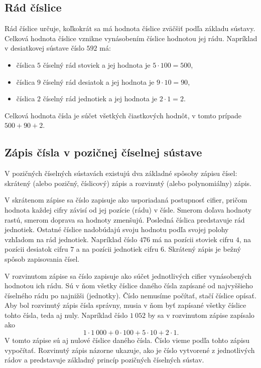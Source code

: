\documentclass{report}
\begin{document}
\subsection{Rád číslice}

Rád číslice určuje, koľkokrát sa má hodnota číslice zväčšiť podľa základu sústavy. Celková hodnota číslice vznikne vynásobením číslice hodnotou jej rádu. Napríklad v desiatkovej sústave číslo \(592\) má:
\begin{itemize}
  \item číslica \(5\) číselný rád stoviek a jej hodnota je \(5 \cdot 100 = 500\),
  \item číslica \(9\) číselný rád desiatok a jej hodnota je \(9 \cdot 10 = 90\),
  \item číslica \(2\) číselný rád jednotiek a jej hodnota je \(2 \cdot 1 = 2\).
\end{itemize}
Celková hodnota čísla je súčet všetkých čiastkových hodnôt, v tomto prípade \(500 + 90 + 2\).

\subsection{Zápis čísla v pozičnej číselnej sústave}

V pozičných číselných sústavách existujú dva základné spôsoby zápisu čísel: skrátený (alebo pozičný, číslicový) zápis a rozvinutý (alebo polynomiálny) zápis.

V skrátenom zápise sa číslo zapisuje ako usporiadaná postupnosť cifier, pričom hodnota každej cifry závisí od jej pozície (rádu) v čísle. Smerom doľava hodnoty rastú, smerom doprava sa hodnoty zmenšujú. Posledná číslica predstavuje rád jednotiek. Ostatné číslice nadobúdajú svoju hodnotu podľa svojej polohy vzhľadom na rád jednotiek. Napríklad číslo \(476\) má na pozícii stoviek cifru \(4\), na pozícii desiatok cifru \(7\) a na pozícii jednotiek cifru \(6\). Skrátený zápis je bežný spôsob zapisovania čísel.

V rozvinutom zápise sa číslo zapisuje ako súčet jednotlivých cifier vynásobených hodnotou ich rádu. Sú v ňom všetky číslice daného čísla zapísané od najvyššieho číselného rádu po najnižši (jednotky). Číslo nemusíme počítať, stačí číslice opísať. Aby bol rozvinutý zápis čísla správny, musia v ňom byť zapísané všetky číslice tohto čísla, teda aj nuly. Napríklad číslo \(1\ 052\) by sa v rozvinutom zápise zapísalo ako
\[
1 \cdot 1\ 000 + 0 \cdot 100 + 5 \cdot 10 + 2 \cdot 1.
\]
V tomto zápise sú aj nulové číslice daného čísla. Číslo vieme podľa tohto zápisu vypočítať. Rozvinutý zápis názorne ukazuje, ako je číslo vytvorené z jednotlivých rádov a predstavuje základný princíp pozičných číselných sústav.
\end{document}
